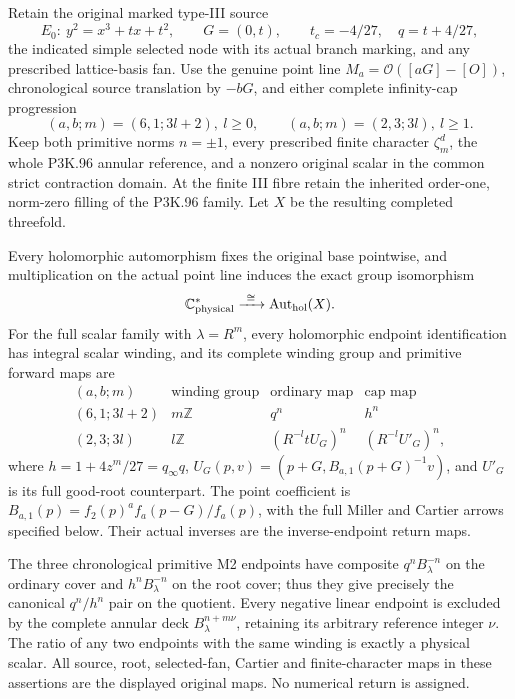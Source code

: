 \begin{theorem}\label{night:P3K.114}
Retain the original marked type-III source
\[
 E_0:\ y^2=x^3+tx+t^2,\qquad G=(0,t),\qquad
 t_c=-4/27,\quad q=t+4/27,
\]
the indicated simple selected node with its actual branch marking,
and any prescribed lattice-basis fan. Use the genuine point line
\(M_a=\mathcal O([aG]-[O])\), chronological source translation by
\(-bG\), and either complete infinity-cap progression
\[
 (a,b;m)=(6,1;3l+2),\ l\ge0,\qquad
 (a,b;m)=(2,3;3l),\ l\ge1.
\]
Keep both primitive norms \(n=\pm1\), every prescribed finite
character \(\zeta_m^d\), the whole P3K.96 annular reference, and a
nonzero original scalar in the common strict contraction domain.
At the finite III fibre retain the inherited order-one, norm-zero
filling of the P3K.96 family.
Let \(X\) be the resulting completed threefold.

Every holomorphic automorphism fixes the original base pointwise,
and multiplication on the actual point line induces the exact
group isomorphism
\[
       \mathbb C^*_{\rm physical}\xrightarrow{\ \cong\ }
                       \operatorname{Aut}_{\rm hol}(X).
\]
For the full scalar family with \(\lambda=R^m\), every holomorphic
endpoint identification has integral scalar winding, and its
complete winding group and primitive forward maps are
\[
\begin{array}{c|c|c|c}
 (a,b;m)&\text{winding group}&\text{ordinary map}&\text{cap map}\\ \hline
 (6,1;3l+2)&m\mathbb Z&q^n&h^n\\
 (2,3;3l)&l\mathbb Z&(R^{-l}tU_G)^n&(R^{-l}U'_G)^n ,
\end{array}
\]
where \(h=1+4z^m/27=q_\infty q\),
\(U_G(p,v)=(p+G,B_{a,1}(p+G)^{-1}v)\), and
\(U'_G\) is its full good-root counterpart. The point coefficient
is \(B_{a,1}(p)=f_2(p)^a f_a(p-G)/f_a(p)\), with the full
Miller and Cartier arrows specified below. Their actual inverses
are the inverse-endpoint return maps.

The three chronological primitive M2 endpoints have composite
\(q^nB_\lambda^{-n}\) on the ordinary cover and
\(h^nB_\lambda^{-n}\) on the root cover; thus they give precisely
the canonical \(q^n/h^n\) pair on the quotient. Every negative
linear endpoint is excluded by the complete annular deck
\(B_\lambda^{n+m\nu}\), retaining its arbitrary reference integer
\(\nu\). The ratio of any two endpoints with the same winding
is exactly a physical scalar. All source, root, selected-fan,
Cartier and finite-character maps in these assertions are the
displayed original maps. No numerical return is assigned.
\end{theorem}
